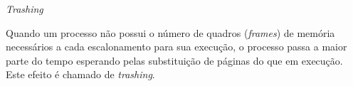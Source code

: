 



\begin{frame}{\em Trashing}

  Quando um processo não possui o número de quadros ({\em frames}) de
  memória necessários a cada escalonamento para sua execução, o
  processo passa a maior parte do tempo esperando pelas substituição
  de páginas do que em execução. Este efeito é chamado de {\em
    trashing}.

\end{frame}

